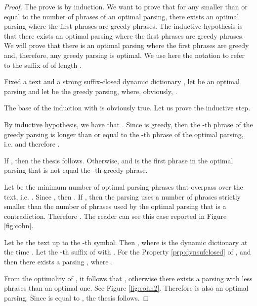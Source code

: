 \documentclass[12pt]{article}
\theoremstyle{plain}
\theoremstyle{definition}
\theoremstyle{remark}
\begin{document}
\begin{proof}
The prove is by induction. We want to prove that for any  smaller than or equal to the number of phrases of an optimal parsing, there exists an optimal parsing where the first  phrases are greedy phrases.
The inductive hypothesis is that there exists an optimal parsing where the first  phrases are greedy phrases. We will prove that there is an optimal parsing where the first  phrases are greedy and, therefore, any greedy parsing is optimal.
We use here the notation  to refer to the suffix of  of length .

Fixed a text  and a strong suffix-closed dynamic dictionary , let  be an optimal parsing and let  be the greedy parsing, where, obviously, . 

The base of the induction with  is obviously true. Let us prove the inductive step.

By inductive hypothesis,   we have that .
Since  is greedy, then the -th phrase of the greedy parsing is longer than or equal to the -th phrase of the optimal parsing, i.e.  and therefore .

If , then the thesis follows.
Otherwise,  and  is the first phrase in the optimal parsing that is not equal the -th greedy phrase.


Let  be the minimum number of optimal parsing phrases that overpass  over the text, i.e. . Since , then .
If , 
then the parsing  uses a number of phrases strictly smaller than the number of phrases used by the optimal parsing that is a contradiction.
Therefore . The reader can see this case reported in Figure \ref{fig:cohn}.



Let  be the text up to the -th symbol. Then , where  is the dynamic dictionary at the time . 
Let  the -th suffix of  with . 
For the Property \ref{prp:dynsufclosed} of ,  and then there exists a parsing , where . 


\begin{figure}[t] \end{figure}




From the optimality of , it follows that , otherwise there exists a parsing with less phrases than an optimal one. See Figure \ref{fig:cohn2}.
Therefore   is also  an optimal parsing. 
Since  is equal to , the thesis follows.
\end{proof}
\end{document}
